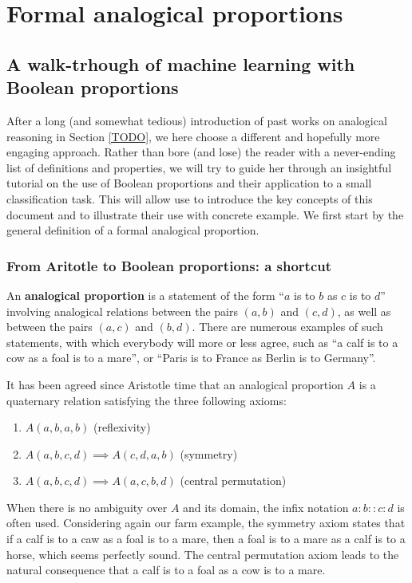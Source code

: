 \chapter{Formal analogical proportions}

\section{A walk-trhough of machine learning with Boolean proportions}

After a long (and somewhat tedious) introduction of past works on analogical
reasoning in Section \ref{TODO}, we here choose a different and hopefully more
engaging approach. Rather than bore (and lose) the reader with a never-ending
list of definitions and properties, we will try to guide her through an
insightful tutorial on the use of Boolean proportions and their application to
a small classification task. This will allow use to introduce the key concepts
of this document and to illustrate their use with concrete example. We first
start by the general definition of a formal analogical proportion.

\subsection{From Aritotle to Boolean proportions: a shortcut}

An \textbf{analogical proportion} is a statement of the form ``$a$ is to $b$ as
$c$ is to $d$'' involving analogical relations between the pairs $(a,b)$ and
$(c,d)$, as well as between the pairs $(a,c)$ and $(b,d)$.  There are numerous
examples of such statements, with which everybody will more or less agree, such
as  ``a calf is to a cow as a foal is to a mare'', or ``Paris is to France as
Berlin is to Germany''.

It has been agreed since Aristotle time that an analogical proportion $A$ is a
quaternary relation satisfying the three following axioms:

\begin{enumerate}
\item $A(a,b,a,b)$ (reflexivity)
\item $A(a,b,c,d) \implies A(c,d,a,b)$ (symmetry)
\item $A(a,b,c,d) \implies A(a,c,b,d)$ (central permutation)
\end{enumerate}

When there is no ambiguity over $A$ and its domain, the infix notation
$a:b::c:d$ is often used. Considering again our farm example, the symmetry
axiom states that if a calf is to a caw as a foal is to a mare, then a foal is
to a mare as a calf is to a horse, which seems perfectly sound. The central
permutation axiom leads to the natural consequence that a calf is to a foal as
a cow is to a mare.

